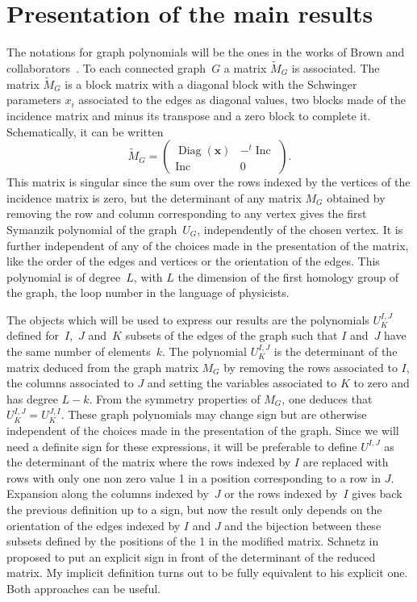\section{Presentation of the main results} \label{presentation}


The notations for graph polynomials will be the ones in the works of
Brown and collabora\-tors~\cite{Br2009,BrYe09}. To each connected graph~$G$ a matrix $\tilde M_G$ is associated.
The matrix $\tilde M_G$ is a block
matrix with a diagonal block with the Schwinger parameters $x_i$ associated to the edges as diagonal values, two
blocks made of the incidence matrix and minus its transpose and a zero block to complete it. Schematically, it can be written
\begin{equation*}
	\tilde M_G = \begin{pmatrix}
		\operatorname{Diag}(\mathbf{x}) & -{}^t \operatorname{Inc} \\ \operatorname{Inc} & 0
	\end{pmatrix}.
\end{equation*}
This matrix is singular since the sum over the rows indexed by the vertices of the incidence matrix is zero, but the
determinant of any matrix $M_G$ obtained by removing the row and column corresponding to any vertex gives the first
Symanzik polynomial of the graph~$U_G$, independently of the chosen vertex. It is further independent of any of the choices made in the
presentation of the matrix, like the order of the edges and vertices or the orientation of the edges. This polynomial is of degree~$L$, with
$L$ the dimension of the first homology group of the graph, the loop number in the language of physicists.

The objects which will be used to express our results are the polynomials
$U^{I ,J}_K$ defined for~$I$,~$J$ and~$K$ subsets of the edges of the graph
such that $I$ and~$J$ have the same number of elements~$k$. The polynomial
$U^{I ,J}_K$ is the determinant of the matrix deduced from the graph matrix $M_G$ by
removing the rows associated to $I$, the columns associated to $J$ and setting
the variables associated to $K$ to zero and has degree $L-k$. From the symmetry properties of $M_G$,
one deduces that $U^{I ,J}_K = U^{J,I}_K$. These graph polynomials may change sign but are otherwise independent of
the choices made in the presentation of the graph. Since
we will need a definite sign for these expressions, it will be preferable to define
$U^{I ,J}$ as the determinant of the matrix where the rows indexed by $I$ are
replaced with rows with only one non zero value 1 in a position corresponding to a row in
$J$. Expansion along the columns indexed by~$J$ or the rows indexed by~$I$ gives back the previous definition up to
a sign, but now the result only depends on the orientation of the edges indexed by
$I$ and $J $ and the bijection between these subsets
defined by the positions of the 1 in the modified matrix. Schnetz in~\cite{SC2021} proposed to put
an explicit sign in front of the determinant of the reduced matrix. My implicit definition turns out to be fully equivalent to his
explicit one. Both approaches can be useful.

